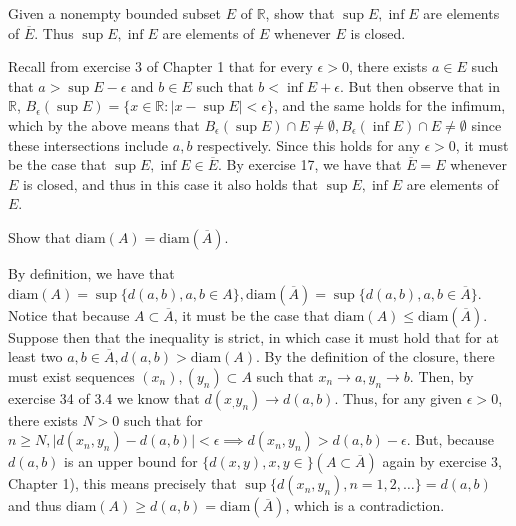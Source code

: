\begin{exercise}{18}
    Given a nonempty bounded subset $E$ of $\mathbb{R}$, show that $\sup E, \inf E$ are elements of $\overline{E}$.
    Thus $\sup E, \inf E$ are elements of $E$ whenever $E$ is closed.
\end{exercise}

\begin{solution}
    
    Recall from exercise 3 of Chapter 1 that for every $\epsilon > 0$, there exists $a \in E$ such that $a > \sup E - \epsilon$ and $b \in E$ such that $b < \inf E + \epsilon$.
    But then observe that in $\mathbb{R}$, $B_{\epsilon}(\sup E) = \{x \in \mathbb{R}: \lvert x - \sup E \rvert < \epsilon\}$, and the same holds for the infimum, which by the above means that $B_{\epsilon}(\sup E) \cap E \neq \emptyset, B_{\epsilon}(\inf E) \cap E \neq \emptyset$ since these intersections include $a, b$ respectively.
    Since this holds for any $\epsilon > 0$, it must be the case that $\sup E, \inf E \in \overline{E}$.
    By exercise 17, we have that $\overline{E} = E$ whenever $E$ is closed, and thus in this case it also holds that $\sup E, \inf E$ are elements of $E$.
\end{solution}

\begin{exercise}{19}
    Show that $\text{diam}(A) = \text{diam}(\overline{A})$.
\end{exercise}

\begin{solution}
    
    By definition, we have that $\text{diam}(A) = \sup \{d(a, b), a, b \in A\}, \text{diam}(\overline{A}) = \sup \{d(a, b), a, b \in \overline{A} \}$.
    Notice that because $A \subset \overline{A}$, it must be the case that $\text{diam}(A) \leq \text{diam}(\overline{A})$.
    Suppose then that the inequality is strict, in which case it must hold that for at least two $a, b \in \overline{A}, d(a, b) > \text{diam}(A)$.
    By the definition of the closure, there must exist sequences $(x_n), (y_n) \subset A$ such that $x_n \rightarrow a, y_n \rightarrow b$.
    Then, by exercise 34 of 3.4 we know that $d(x_, y_n) \rightarrow d(a, b)$.
    Thus, for any given $\epsilon > 0$, there exists $N > 0$ such that for $n \geq N, \lvert d(x_n, y_n) - d(a, b) \rvert < \epsilon \implies d(x_n, y_n) > d(a, b) - \epsilon$.
    But, because $d(a, b)$ is an upper bound for $\{d(x, y), x, y \in \} (A \subset \overline{A})$ again by exercise 3, Chapter 1), this means precisely that $\sup \{d(x_n, y_n), n = 1, 2, \ldots\} = d(a, b)$ and thus $\text{diam}(A) \geq d(a, b) = \text{diam}(\overline{A})$, which is a contradiction.
    
\end{solution}

